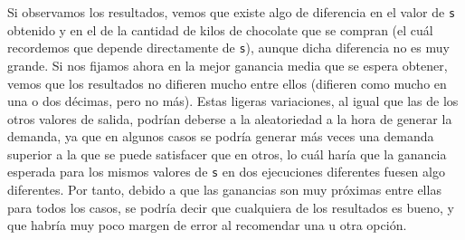 \documentclass[11pt,a4paper]{article}
\begin{document}
\begin{table}[H]
\centering
{}
\caption{Resutados obtenidos por el modelo tras 10 ejecuciones con $\texttt{numVeces} = 100000$.}
\label{tab:my-table}
\end{table}

Si observamos los resultados, vemos que existe algo de diferencia en el valor de \texttt{s} obtenido
y en el de la cantidad de kilos de chocolate que se compran (el cuál recordemos que depende
directamente de \texttt{s}), aunque dicha diferencia no es muy grande. Si nos fijamos ahora en la
mejor ganancia media que se espera obtener, vemos que los resultados no difieren mucho entre ellos
(difieren como mucho en una o dos décimas, pero no más). Estas ligeras variaciones, al igual que las
de los otros valores de salida, podrían deberse a la aleatoriedad a la hora de generar la demanda,
ya que en algunos casos se podría generar más veces una demanda superior a la que se puede satisfacer que
en otros, lo cuál haría que la ganancia esperada para los mismos valores de \texttt{s} en dos ejecuciones
diferentes fuesen algo diferentes. Por tanto, debido a que las ganancias son muy próximas entre ellas
para todos los casos, se podría decir que cualquiera de los resultados es bueno, y que habría muy
poco margen de error al recomendar una u otra opción.
\end{document}
